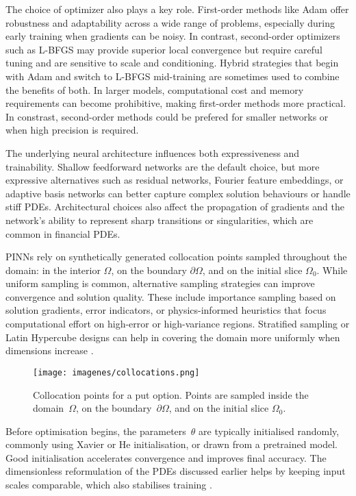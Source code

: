 \documentclass[12pt]{report} %
\theoremstyle{plain} %
\theoremstyle{definition} %
\theoremstyle{remark} %
\begin{document}
The choice of optimizer also plays a key role. First-order methods like Adam offer robustness and adaptability across 
a wide range of problems, especially during early training when gradients can be noisy. In contrast, second-order 
optimizers such as L-BFGS may provide superior local convergence but require careful tuning and are sensitive to 
scale and conditioning. Hybrid strategies that begin with Adam and switch to L-BFGS mid-training are sometimes used 
to combine the benefits of both. In larger models, computational cost and memory requirements can become prohibitive,
making first-order methods more practical. In constrast, second-order methods could be prefered for smaller networks or when
high precision is required.

The underlying neural architecture influences both expressiveness and trainability. 
Shallow feedforward networks are the default choice, but more expressive alternatives such as residual networks, Fourier feature embeddings, or adaptive 
basis networks can better capture complex solution behaviours or handle stiff PDEs. Architectural choices also affect 
the propagation of gradients and the network's ability to represent sharp transitions or singularities, which are common in financial PDEs.

PINNs rely on synthetically generated collocation points sampled throughout the domain: in the interior $\Omega$, on 
the boundary $\partial\Omega$, and on the initial slice $\Omega_0$. While uniform sampling is common, alternative sampling 
strategies can improve convergence and solution quality. These include importance sampling based on solution gradients, 
error indicators, or physics-informed heuristics that focus computational effort on high-error or high-variance regions. Stratified 
sampling or Latin Hypercube designs can help in covering the domain more uniformly when dimensions increase \cite{WU2023115671}. 

\begin{figure}
\centering
\texttt{[image: imagenes/collocations.png]}
\caption{Collocation points for a put option. Points are sampled inside the domain~$\Omega$, on the boundary~$\partial\Omega$, and on the initial slice $\Omega_0$.}
\label{fig:collocations}
\end{figure}

Before optimisation begins, the parameters~$\theta$ are typically initialised randomly, commonly using Xavier or 
He initialisation, or drawn from a pretrained model. Good initialisation accelerates convergence and improves final accuracy. 
The dimensionless reformulation of the PDEs discussed earlier helps by keeping input scales comparable, which also stabilises training \cite{nondimensionalinputs2025}.
\end{document}
